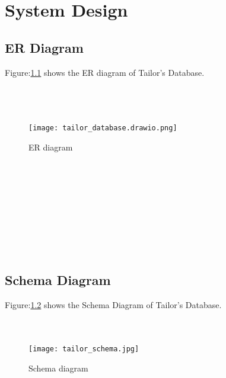\documentclass[12pt, letter paper]{report}
\begin{document}
{\chapter{System Design}
\section{ER Diagram} 
Figure:\ref{fig:tailor_database.drawio.png} shows the ER diagram of Tailor's Database.
\\
\\
\\
\\
\begin{figure}[h]
 \centering
 \texttt{[image: tailor\_database.drawio.png]}
 \caption{ER diagram}
 \label{fig:tailor_database.drawio.png}
\end{figure}
\\
\\
\\
\\
\\
\\
\\
\\
\section{Schema Diagram} 
Figure:\ref{fig:tailor_schema.jpg} shows the Schema Diagram of Tailor's Database.
\\
\\
\\
\begin{figure}[h]
 \centering
 \texttt{[image: tailor\_schema.jpg]}
 \caption{Schema diagram}
 \label{fig:tailor_schema.jpg}
\end{figure}
}
\end{document}
